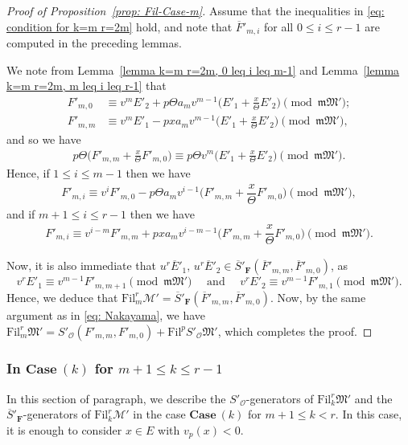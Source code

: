 \documentclass[11pt]{amsart}
\theoremstyle{definition}
\numberwithin{equation}{subsection}
\theoremstyle{plain}
\theoremstyle{plain}
\theoremstyle{plain}
\theoremstyle{plain}
\theoremstyle{plain}
\theoremstyle{plain}
\theoremstyle{plain}
\theoremstyle{plain}
\theoremstyle{plain}
\theoremstyle{plain}
\theoremstyle{plain}
\theoremstyle{plain}
\theoremstyle{definition}
\theoremstyle{definition}
\theoremstyle{definition}
\theoremstyle{remark}
\renewcommand{\(}{\textup{(}}
\renewcommand{\)}{\textup{)}}
\newcommand{\F}{\mathbf{F}}
\newcommand{\barS}{\overline{S}}
\newcommand{\cM}{\mathcal{M}}
\newcommand{\fM}{\mathfrak{M}}
\newcommand{\fm}{\mathfrak{m}}
\newcommand{\Fil}{\mathrm{Fil}}
\newcommand{\cO}{\mathcal{O}}
\newcommand{\barE}{\overline{E}}
\newcommand{\barF}{\overline{F}}
\begin{document}
\begin{proof}[Proof of Proposition~\ref{prop: Fil-Case-m}]
Assume that the inequalities in \eqref{eq: condition for k=m r=2m} hold, and note that $\barF'_{m,i}$ for all $0\leq i\leq r-1$ are computed in the preceding lemmas.


We note from Lemma~\ref{lemma k=m r=2m, 0 leq i leq m-1} and Lemma~\ref{lemma k=m r=2m, m leq i leq r-1} that
\begin{align*}
F'_{m,0}
    &\equiv
    v^mE'_2+p\Theta a_mv^{m-1}\bigg(E'_1+\frac{x}{\Theta}E'_2\bigg)
    \pmod{\fm\fM'};\\
F'_{m,m}
    &\equiv
    v^mE'_1-pxa_mv^{m-1}\bigg(E'_1+\frac{x}{\Theta}E'_2\bigg)
    \pmod{\fm\fM'},
\end{align*}
and so we have
\begin{align*}
    p\Theta\bigg(F'_{m,m}+\frac{x}{\Theta}F'_{m,0}\bigg)
    \equiv
    p\Theta v^m\bigg(E'_1+\frac{x}{\Theta}E'_2\bigg)
    \pmod{\fm\fM'}.
\end{align*}
Hence, if $1\leq i\leq m-1$ then we have
\begin{align*}
    F'_{m,i}\equiv v^iF'_{m,0}-p\Theta a_mv^{i-1}\bigg(F'_{m,m}+\dfrac{x}{\Theta}F'_{m,0}\bigg)  \pmod{\fm\fM'},
\end{align*}
and if $m+1\leq i\leq r-1$ then we have
\begin{align*}
    F'_{m,i} \equiv v^{i-m}F'_{m,m}+pxa_mv^{i-m-1}\bigg(F'_{m,m}+\dfrac{x}{\Theta}F'_{m,0}\bigg)  \pmod{\fm\fM'}.
\end{align*}

Now, it is also immediate that $u^r\barE'_1,\,u^r\barE'_2\in \barS'_\F(\barF'_{m,m},\barF'_{m,0})$, as $$v^rE'_1\equiv v^{m-1}F'_{m,m+1}\pmod{\fm\fM'}\quad\mbox{ and }\quad v^rE'_2\equiv v^{m-1}F'_{m,1}\pmod{\fm\fM'}.$$ Hence, we deduce that $\Fil^r_{m}\cM'=\barS'_\F(\barF'_{m,m},\barF'_{m,0})$. Now, by the same argument as in \eqref{eq: Nakayama}, we have
$\Fil^r_{m}\fM' =S'_\cO(F'_{m,m},F'_{m,0})+\Fil^pS'_\cO\fM'$, which completes the proof.
\end{proof}





\subsubsection{\textbf{In $\mathbf{Case}~(k)$ for $m+1\leq k \leq r-1$}}
In this section of paragraph, we describe the $S'_\cO$-generators of $\Fil^r_{k}\fM'$ and the $\barS'_\F$-generators of $\Fil^r_{k}\cM'$ in the case $\mathbf{Case}~(k)$ for $m+1\leq k<r$. In this case, it is enough to consider $x\in E$ with $v_p(x)<0$.
\end{document}
